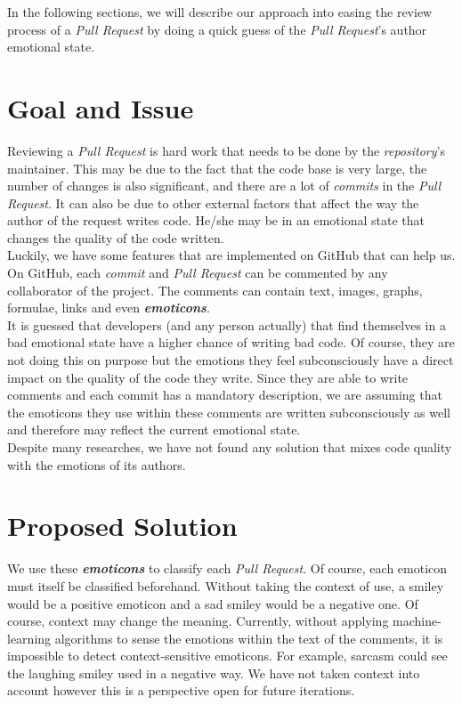 \documentclass[journal]{IEEEtran}
\begin{document}
In the following sections, we will describe our approach into easing the review process of a \emph{Pull Request} by doing a quick guess of the \emph{Pull Request}'s author emotional state.

\section{Goal and Issue}
Reviewing a \emph{Pull Request} is hard work that needs to be done by the \emph{repository}'s maintainer. This may be due to the fact that     the code base is very large, the number of changes is also significant, and there are a lot of \emph{commits} in the \emph{Pull Request}. It can also be due to other external factors that affect the way the author of the request writes code. He/she may be in an emotional state that changes the quality of the code written.\\

Luckily, we have some features that are implemented on GitHub that can help us. On GitHub, each \emph{commit} and \emph{Pull Request} can be commented by any collaborator of the project. The comments can contain text, images, graphs, formulae, links and even \emph{\textbf{emoticons}}.\\

It is guessed that developers (and any person actually) that find themselves in a bad emotional state have a higher chance of writing bad code. Of course, they are not doing this on purpose but the emotions they feel subconsciously have a direct impact on the quality of the code they write. Since they are able to write comments and each commit has a mandatory description, we are assuming that the emoticons they use within these comments are written subconsciously as well and therefore may reflect the current emotional state. \\

Despite many researches, we have not found any solution that mixes code quality with the emotions of its authors.


\section{Proposed Solution}
We use these \emph{\textbf{emoticons}} to classify each \emph{Pull Request}. Of course, each emoticon must itself be classified beforehand. Without taking the context of use, a smiley would be a positive emoticon and a sad smiley would be a negative one. Of course, context may change the meaning. Currently, without applying machine-learning algorithms to sense the emotions within the text of the comments, it is impossible to detect context-sensitive emoticons. For example, sarcasm could see the laughing smiley used in a negative way. We have not taken context into account however this is a perspective open for future iterations.\\
\end{document}
